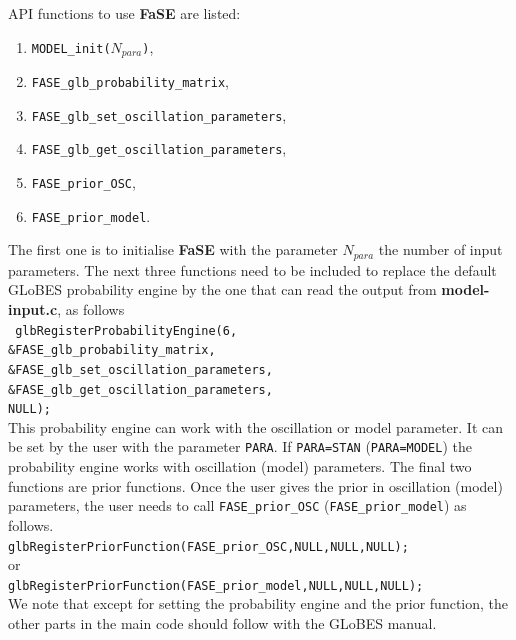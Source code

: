 \documentclass[aps,prd,nofootinbib,preprint]{revtex4}
\begin{document}
API functions to use \textbf{FaSE} are listed:
\begin{enumerate}
\item \texttt{MODEL\_init($N_{para}$)},
\item  \texttt{FASE\_glb\_probability\_matrix},
\item  \texttt{FASE\_glb\_set\_oscillation\_parameters},
\item  \texttt{FASE\_glb\_get\_oscillation\_parameters},
\item \texttt{FASE\_prior\_OSC},
\item \texttt{FASE\_prior\_model}.
\end{enumerate}
The first one is to initialise \textbf{FaSE} with the parameter $N_{para}$ the number of input parameters. The next three functions need to be included to replace the default GLoBES probability engine by the one that can read the output from \textbf{model-input.c}, as follows\vspace{0.2cm}\\
\texttt{    glbRegisterProbabilityEngine(6,\\
                                 \&FASE\_glb\_probability\_matrix,\\
                                 \&FASE\_glb\_set\_oscillation\_parameters,\\
                                 \&FASE\_glb\_get\_oscillation\_parameters,\\
                                 NULL); }\vspace{0.2cm}\\ 
This probability engine can work with the oscillation or model parameter. It can be set by the user with the parameter \texttt{PARA}. If \texttt{PARA=STAN} (\texttt{PARA=MODEL}) the probability engine works with oscillation (model) parameters. The final two functions are prior functions. Once the user gives the prior in oscillation (model) parameters, the user needs to call \texttt{FASE\_prior\_OSC} (\texttt{FASE\_prior\_model}) as follows.\vspace{0.2cm}\\
\texttt{glbRegisterPriorFunction(FASE\_prior\_OSC,NULL,NULL,NULL); }  \\
or\\
\texttt{glbRegisterPriorFunction(FASE\_prior\_model,NULL,NULL,NULL); } \vspace{0.2cm}\\
We note that except for setting the probability engine and the prior function, the other parts in the main code should follow with the GLoBES manual. 
\end{document}
